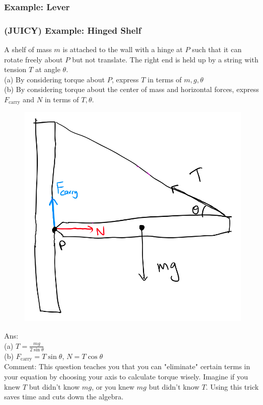 \documentclass{article}
\begin{document}
\subsubsection{Example: Lever}

\clearpage 
\subsubsection{(JUICY) Example: Hinged Shelf}
A shelf of mass $m$ is attached to the wall with a hinge at $P$ such that it can rotate freely about $P$ but not translate. The right end is held up by a string with tension $T$ at angle $\theta$. \\[5pt] 
(a) By considering torque about $P$, express $T$ in terms of $m,g,\theta$ \\[5pt] 
(b) By considering torque about the center of mass and horizontal forces, express $F_{\text{carry}}$ and $N$ in terms of $T,\theta$. \\
\begin{figure} 
\includegraphics[width=\linewidth]{images/shelf0.png}
\label{fig:shelf}
\end{figure}
Ans: \\ (a) $T = \frac{mg}{2\sin\theta}$ \\ (b) $F_{\text{carry}} = T \sin \theta$, $N = T \cos \theta$\\[20pt]
Comment: This question teaches you that you can "eliminate" certain terms in your equation by choosing your axis to calculate torque wisely. Imagine if you knew $T$ but didn't know $mg$, or you knew $mg$ but didn't know $T$. Using this trick saves time and cuts down the algebra.
\clearpage
\end{document}
